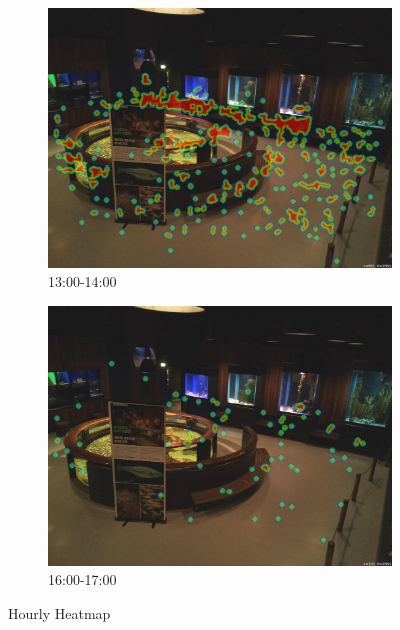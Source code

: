 \begin{figure}[H]
    \centering
    \begin{subfigure}{0.475\textwidth}
        \centering
        \includegraphics[width=\textwidth]{Images/Analytics/heatmap_time_1300_1400.jpg}
        \caption{13:00-14:00}
    \end{subfigure}
    \hfill
    \begin{subfigure}{0.475\textwidth}
        \centering
        \includegraphics[width=\textwidth]{Images/Analytics/heatmap_time_1600_1700.jpg}
        \caption{16:00-17:00}
    \end{subfigure}
    \caption{Hourly Heatmap}
    \label{fig:heatmap_time}
\end{figure}

